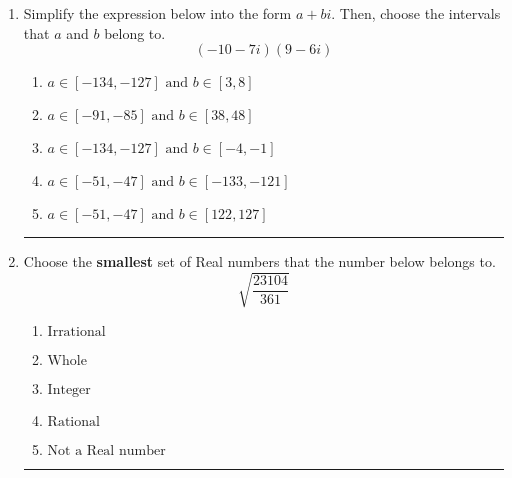 \documentclass[14pt]{extbook}
\newcommand{\litem}[1]{\item#1\hspace*{-1cm}\rule{\textwidth}{0.4pt}}
\begin{document}
\begin{enumerate}
{\begin{enumerate}[label=\Alph*.]
\end{enumerate} }
\litem{
Simplify the expression below into the form $a+bi$. Then, choose the intervals that $a$ and $b$ belong to.\[ (-10 - 7 i)(9 - 6 i) \]\begin{enumerate}[label=\Alph*.]
\item \( a \in [-134, -127] \text{ and } b \in [3, 8] \)
\item \( a \in [-91, -85] \text{ and } b \in [38, 48] \)
\item \( a \in [-134, -127] \text{ and } b \in [-4, -1] \)
\item \( a \in [-51, -47] \text{ and } b \in [-133, -121] \)
\item \( a \in [-51, -47] \text{ and } b \in [122, 127] \)

\end{enumerate} }
\litem{
Choose the \textbf{smallest} set of Real numbers that the number below belongs to.\[ \sqrt{\frac{23104}{361}} \]\begin{enumerate}[label=\Alph*.]
\item \( \text{Irrational} \)
\item \( \text{Whole} \)
\item \( \text{Integer} \)
\item \( \text{Rational} \)
\item \( \text{Not a Real number} \)

\end{enumerate} }
\end{enumerate}
\end{document}
